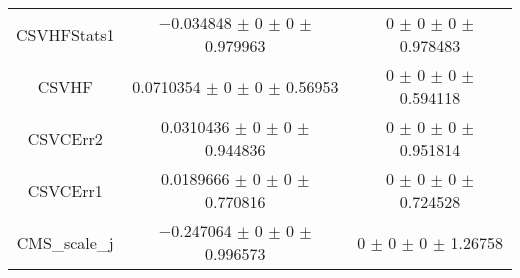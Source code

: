 \begin{table}
\begin{tabular}{ccc}
CSVHFStats1 & \num{-0.034848} $\pm$ \num{0} $\pm$ \num{0} $\pm$ \num{0.979963} & \num{0} $\pm$ \num{0} $\pm$ \num{0} $\pm$ \num{0.978483}\\
CSVHF & \num{0.0710354} $\pm$ \num{0} $\pm$ \num{0} $\pm$ \num{0.56953} & \num{0} $\pm$ \num{0} $\pm$ \num{0} $\pm$ \num{0.594118}\\
CSVCErr2 & \num{0.0310436} $\pm$ \num{0} $\pm$ \num{0} $\pm$ \num{0.944836} & \num{0} $\pm$ \num{0} $\pm$ \num{0} $\pm$ \num{0.951814}\\
CSVCErr1 & \num{0.0189666} $\pm$ \num{0} $\pm$ \num{0} $\pm$ \num{0.770816} & \num{0} $\pm$ \num{0} $\pm$ \num{0} $\pm$ \num{0.724528}\\
CMS\_scale\_j & \num{-0.247064} $\pm$ \num{0} $\pm$ \num{0} $\pm$ \num{0.996573} & \num{0} $\pm$ \num{0} $\pm$ \num{0} $\pm$ \num{1.26758}\\
\bottomrule
\end{tabular}
\end{table}